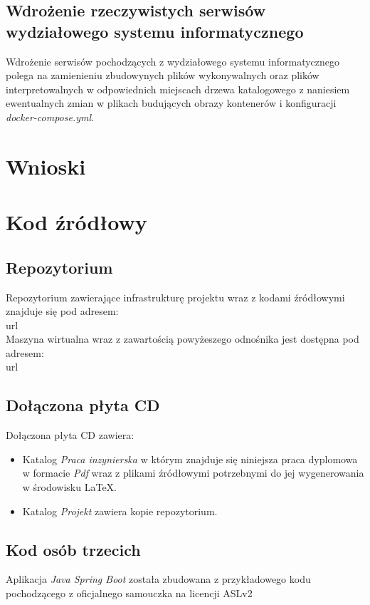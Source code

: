 \documentclass[polish, a4paper, 12pt, oneside]{book}
\begin{document}
\section{Wdrożenie rzeczywistych serwisów wydziałowego systemu informatycznego}
Wdrożenie serwisów pochodzących z wydziałowego systemu informatycznego polega na zamienieniu zbudowynych plików wykonywalnych oraz plików interpretowalnych w odpowiednich miejscach drzewa katalogowego z naniesiem ewentualnych zmian w plikach budujących obrazy kontenerów i konfiguracji \textit{docker-compose.yml}.

\chapter{Wnioski}

\chapter{Kod źródłowy}

\section{Repozytorium}
Repozytorium zawierające infrastrukturę projektu wraz z kodami źródłowymi znajduje się pod adresem:\\
url\\
Maszyna wirtualna wraz z zawartością powyżeszego odnośnika jest dostępna pod adresem:\\
url\\

\section{Dołączona płyta CD}
Dołączona płyta CD zawiera:
\begin{itemize}[noitemsep]
	\item Katalog \textit{Praca inzynierska} w którym znajduje się niniejsza praca dyplomowa w formacie \textit{Pdf} wraz z plikami źródłowymi potrzebnymi do jej wygenerowania w środowisku \LaTeX.
	\item Katalog \textit{Projekt} zawiera kopie repozytorium.
\end{itemize}

\section{Kod osób trzecich}
Aplikacja \textit{Java Spring Boot} została zbudowana z przykładowego kodu pochodzącego z oficjalnego samouczka\cite{springboot} na licencji ASLv2


\end{document}

